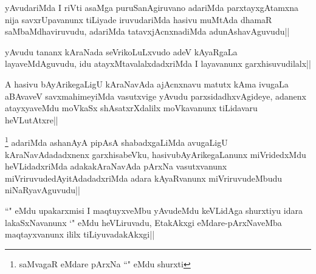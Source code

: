 \begin{artha}
yAvudariMda I riVti asaMga puruSanAgiruvano adariMda parxtayxgAtamxna nija savxrUpavanunx tiLiyade iruvudariMda hasivu muMtAda dhamaR saMbaMdhaviruvudu, adariMda tatavxjAcnxnadiMda adunAshavAguvudu||
\end{artha}


\begin{artha}
yAvudu tananx kAraNada seVrikoLuLxvudo adeV kAyaRgaLa layaveMdAguvudu, idu atayxMtavalalxdadxriMda I layavanunx garxhisuvudilalx||
\end{artha}


\begin{artha}
A hasivu bAyArikegaLigU kAraNavAda ajAcnxnavu matutx kAma ivugaLa aBAvaveV savxmahimeyiMda vasutxvige yAvudu parxsidadhxvAgideye, adanenx atayxyaveMdu moVkaSx shAsatxrXdalilx moVkavanunx tiLidavaru heVLutAtxre||
\end{artha}

\begin{artha}
\footnote[1]{saMvagaR eMdare pArxNa ``\stext " eMdu shurxti} adariMda ashanAyA pipAsA shabadxgaLiMda avugaLigU kAraNavAdadadxnenx garxhisabeVku, hasivubAyArikegaLanunx miVridedxMdu heVLidadxriMda adakakAraNavAda pArxNa vasutxvanunx miVriruvudedAyitAdadadxriMda adara kAyaRvanunx miVriruvudeMbudu niNaRyavAguvudu||
\end{artha}


\begin{artha}
``\stext " eMdu upakarxmisi I maqtuyxveMbu yAvudeMdu keVLidAga shurxtiyu idara lakaSxNavanunx `\stext " eMdu heVLiruvadu, EtakAkxgi eMdare-pArxNaveMba maqtayxvanunx ililx tiLiyuvadakAkxgi||
\end{artha}

\vishaya{}%
